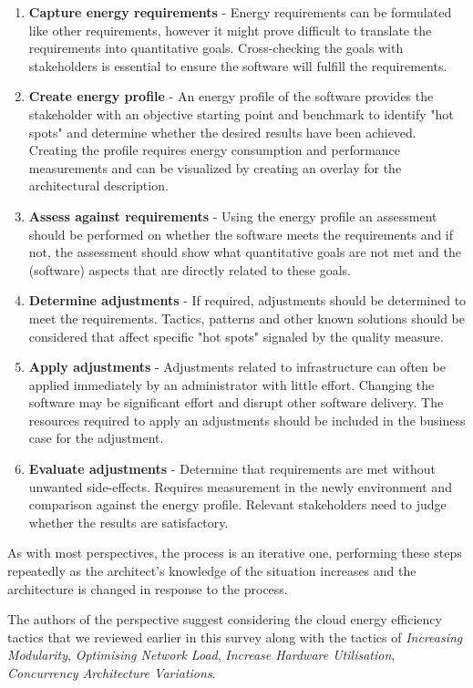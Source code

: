 \begin{enumerate}
	\item \textbf{Capture energy requirements} - Energy requirements can be formulated like other requirements, however it might prove difficult to translate the requirements into quantitative goals. Cross-checking the goals with stakeholders is essential to ensure the software will fulfill the requirements.
	\item \textbf{Create energy profile} - An energy profile of the software provides the stakeholder with an objective starting point and benchmark to identify "hot spots" and determine whether the desired results have been achieved. Creating the profile requires energy consumption and performance measurements and can be visualized by creating an overlay for the architectural description.
	\item \textbf{Assess against requirements} - Using the energy profile an assessment should be performed on whether the software meets the requirements and if not, the assessment should show what quantitative goals are not met and the (software) aspects that are directly related to these goals.
	\item \textbf{Determine adjustments} - If required, adjustments should be determined to meet the requirements. Tactics, patterns and other known solutions should be considered that affect specific "hot spots" signaled by the quality measure.
	\item \textbf{Apply adjustments} - Adjustments related to infrastructure can often be applied immediately by an administrator with little effort. Changing the software may be significant effort and disrupt other software delivery. The resources required to apply an adjustments should be included in the business case for the adjustment.
	\item \textbf{Evaluate adjustments} - Determine that requirements are met without unwanted side-effects. Requires measurement in the newly environment and comparison against the energy profile. Relevant stakeholders need to judge whether the results are satisfactory.
\end{enumerate}

As with most perspectives, the process is an iterative one, performing these steps repeatedly as the architect's knowledge of the situation increases and the architecture is changed in response to the process.

The authors of the perspective suggest considering the cloud energy efficiency tactics that we reviewed earlier in this survey along with the tactics of \emph{Increasing Modularity}, \emph{Optimising Network Load}, \emph{Increase Hardware Utilisation}, \emph{Concurrency Architecture Variations}.

